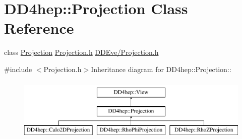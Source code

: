 \hypertarget{class_d_d4hep_1_1_projection}{
\section{DD4hep::Projection Class Reference}
\label{class_d_d4hep_1_1_projection}
}


class \hyperlink{class_d_d4hep_1_1_projection}{Projection} \hyperlink{_projection_8h}{Projection.h} \hyperlink{_projection_8h}{DDEve/Projection.h}  


{\ttfamily \#include $<$Projection.h$>$}Inheritance diagram for DD4hep::Projection::\begin{figure}[H]
\begin{center}
\leavevmode
\includegraphics[height=3cm]{class_d_d4hep_1_1_projection}
\end{center}
\end{figure}
